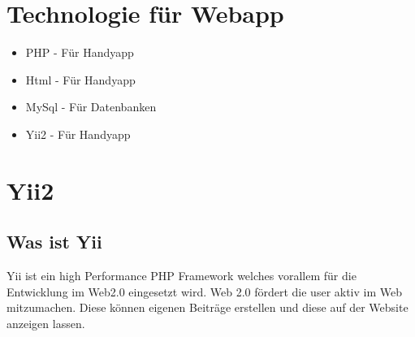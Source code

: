 	\def \currentAuthor {Florian Tipotsch}
	\section{Technologie für Webapp}
\begin{itemize}
	\item PHP - Für Handyapp
	\item Html - Für Handyapp 	
	\item MySql - Für Datenbanken
	\item Yii2 - Für Handyapp
\end{itemize}
	\section{Yii2}
	\subsection{Was ist Yii}
	Yii ist ein high Performance PHP Framework welches vorallem für die Entwicklung im Web2.0 eingesetzt wird. Web 2.0 fördert die user aktiv im Web mitzumachen. Diese können eigenen Beiträge erstellen und diese auf der Website anzeigen lassen.\citep[S.1]{https://en.wikipedia.org/wiki/Web_2.0}
